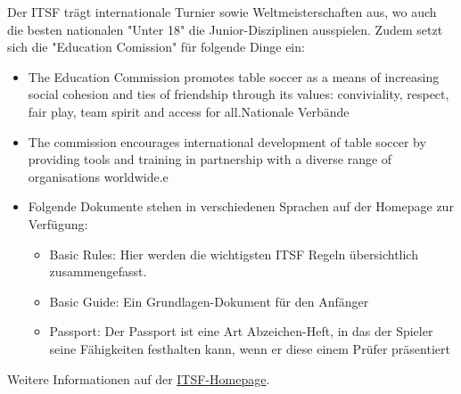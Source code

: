 Der ITSF trägt internationale Turnier sowie Weltmeisterschaften aus, wo auch die besten nationalen "Unter 18" die Junior-Disziplinen ausspielen.
Zudem setzt sich die "Education Comission" für folgende Dinge ein:
\begin{itemize}
\item The Education Commission promotes table soccer as a means of increasing social cohesion and ties of friendship through its values: conviviality, respect, fair play, team spirit and access for all.Nationale Verbände
\item The commission encourages international development of table soccer by providing tools and training in partnership with a diverse range of organisations worldwide.e
\item Folgende Dokumente stehen in verschiedenen Sprachen auf der Homepage zur Verfügung:
\begin{itemize}
\item Basic Rules: Hier werden die wichtigsten ITSF Regeln übersichtlich zusammengefasst.
\item Basic Guide: Ein Grundlagen-Dokument für den Anfänger 
\item Passport: Der Passport ist eine Art Abzeichen-Heft, in das der Spieler seine Fähigkeiten festhalten kann, wenn er diese einem Prüfer präsentiert
\end{itemize}
\end{itemize}
Weitere Informationen auf der \href{http://www.table-soccer.org/}{ITSF-Homepage}.


